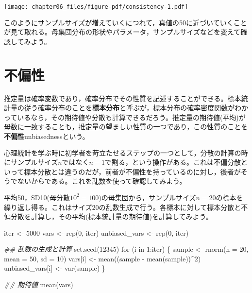 \documentclass[
  a4paper,
]{ltjsbook}
\newenvironment{Shaded}{\begin{snugshade}}{\end{snugshade}}
\newcommand{\AttributeTok}[1]{\textcolor[rgb]{0.40,0.45,0.13}{#1}}
\newcommand{\ControlFlowTok}[1]{\textcolor[rgb]{0.00,0.23,0.31}{#1}}
\newcommand{\DecValTok}[1]{\textcolor[rgb]{0.68,0.00,0.00}{#1}}
\newcommand{\DocumentationTok}[1]{\textcolor[rgb]{0.37,0.37,0.37}{\textit{#1}}}
\newcommand{\FunctionTok}[1]{\textcolor[rgb]{0.28,0.35,0.67}{#1}}
\newcommand{\NormalTok}[1]{\textcolor[rgb]{0.00,0.23,0.31}{#1}}
\newcommand{\OtherTok}[1]{\textcolor[rgb]{0.00,0.23,0.31}{#1}}
\newcommand{\SpecialCharTok}[1]{\textcolor[rgb]{0.37,0.37,0.37}{#1}}
\begin{document}
\texttt{[image: chapter06\_files/figure-pdf/consistency-1.pdf]}

このようにサンプルサイズが増えていくにつれて，真値の50に近づいていくことが見て取れる。母集団分布の形状やパラメータ，サンプルサイズなどを変えて確認してみよう。

\section{不偏性}\label{ux4e0dux504fux6027}

推定量は確率変数であり，確率分布でその性質を記述することができる。標本統計量の従う確率分布のことを\textbf{標本分布}と呼ぶが，標本分布の確率密度関数がわかっているなら，その期待値や分散も計算できるだろう。推定量の期待値(平均)が母数に一致することも，推定量の望ましい性質の一つであり，この性質のことを\textbf{不偏性}unbiasednessという。

心理統計を学ぶ時に初学者を苛立たせるステップの一つとして，分散の計算の時にサンプルサイズ\(n\)ではなく\(n-1\)で割る，という操作がある。これは不偏分散といって標本分散とは違うのだが，前者が不偏性を持っているのに対し，後者がそうでないからである。これを乱数を使って確認してみよう。

平均50，SD10(母分散\(10^2=100\))の母集団から，サンプルサイズ\(n=20\)の標本を繰り返し得る。これはサイズ20の乱数生成で行う。各標本に対して標本分散と不偏分散を計算し，その平均(標本統計量の期待値)を計算してみよう。

\begin{Shaded}
\begin{Highlighting}[]
\NormalTok{iter }\OtherTok{\textless{}{-}} \DecValTok{5000}
\NormalTok{vars }\OtherTok{\textless{}{-}} \FunctionTok{rep}\NormalTok{(}\DecValTok{0}\NormalTok{, iter)}
\NormalTok{unbiased\_vars }\OtherTok{\textless{}{-}} \FunctionTok{rep}\NormalTok{(}\DecValTok{0}\NormalTok{, iter)}

\DocumentationTok{\#\# 乱数の生成と計算}
\FunctionTok{set.seed}\NormalTok{(}\DecValTok{12345}\NormalTok{)}
\ControlFlowTok{for}\NormalTok{ (i }\ControlFlowTok{in} \DecValTok{1}\SpecialCharTok{:}\NormalTok{iter) \{}
\NormalTok{  sample }\OtherTok{\textless{}{-}} \FunctionTok{rnorm}\NormalTok{(}\AttributeTok{n =} \DecValTok{20}\NormalTok{, }\AttributeTok{mean =} \DecValTok{50}\NormalTok{, }\AttributeTok{sd =} \DecValTok{10}\NormalTok{)}
\NormalTok{  vars[i] }\OtherTok{\textless{}{-}} \FunctionTok{mean}\NormalTok{((sample }\SpecialCharTok{{-}} \FunctionTok{mean}\NormalTok{(sample))}\SpecialCharTok{\^{}}\DecValTok{2}\NormalTok{)}
\NormalTok{  unbiased\_vars[i] }\OtherTok{\textless{}{-}} \FunctionTok{var}\NormalTok{(sample)}
\NormalTok{\}}

\DocumentationTok{\#\# 期待値}
\FunctionTok{mean}\NormalTok{(vars)}
\end{Highlighting}
\end{Shaded}
\end{document}
